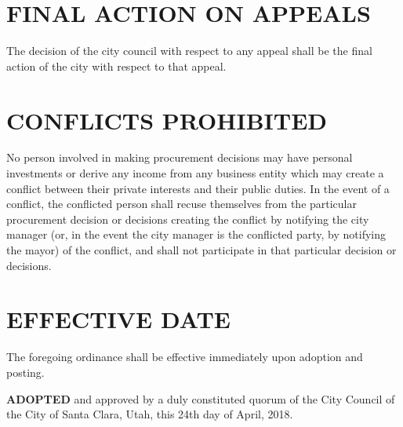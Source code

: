 \section{FINAL ACTION ON APPEALS}
The decision of the city council with respect to any appeal shall be the final action of the city with respect to that appeal. 

\section{CONFLICTS PROHIBITED}
No person involved in making procurement decisions may have personal investments or derive any income from any business entity which may create a conflict between their private interests and their public duties.  In the event of a conflict, the conflicted person shall recuse themselves from the particular procurement decision or decisions creating the conflict by notifying the city manager (or, in the event the city manager is the conflicted party, by notifying the mayor) of the conflict, and shall not participate in that particular decision or decisions. 

\section{EFFECTIVE DATE}
The foregoing ordinance shall be effective immediately upon adoption and posting. 

\textbf{ADOPTED} and approved by a duly constituted quorum of the City Council of the City of Santa Clara, Utah, this 24th day of April, 2018. 